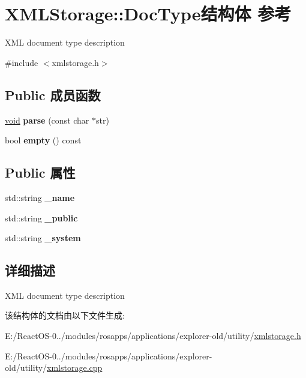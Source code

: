 \hypertarget{struct_x_m_l_storage_1_1_doc_type}{}\section{X\+M\+L\+Storage\+:\+:Doc\+Type结构体 参考}
\label{struct_x_m_l_storage_1_1_doc_type}


X\+ML document type description  




{\ttfamily \#include $<$xmlstorage.\+h$>$}

\subsection*{Public 成员函数}
\begin{DoxyCompactItemize}
\item 
\mbox{\label{struct_x_m_l_storage_1_1_doc_type_a28cd39ddf310d7fec2e90192a3d2f8db}} 
\hyperlink{interfacevoid}{void} {\bfseries parse} (const char $\ast$str)
\item 
\mbox{\label{struct_x_m_l_storage_1_1_doc_type_a84f26b42bce64f5121dc16d51e69fea1}} 
bool {\bfseries empty} () const
\end{DoxyCompactItemize}
\subsection*{Public 属性}
\begin{DoxyCompactItemize}
\item 
\mbox{\label{struct_x_m_l_storage_1_1_doc_type_ab1de175c95c4e33b9f4088bed82faef7}} 
std\+::string {\bfseries \+\_\+name}
\item 
\mbox{\label{struct_x_m_l_storage_1_1_doc_type_a060673a24d56db61f1fb25e40aa6c293}} 
std\+::string {\bfseries \+\_\+public}
\item 
\mbox{\label{struct_x_m_l_storage_1_1_doc_type_aa4c6e61c116bed7cfdafd58671761005}} 
std\+::string {\bfseries \+\_\+system}
\end{DoxyCompactItemize}


\subsection{详细描述}
X\+ML document type description 

该结构体的文档由以下文件生成\+:\begin{DoxyCompactItemize}
\item 
E\+:/\+React\+O\+S-\/0../modules/rosapps/applications/explorer-\/old/utility/\hyperlink{xmlstorage_8h}{xmlstorage.\+h}\item 
E\+:/\+React\+O\+S-\/0../modules/rosapps/applications/explorer-\/old/utility/\hyperlink{xmlstorage_8cpp}{xmlstorage.\+cpp}\end{DoxyCompactItemize}
